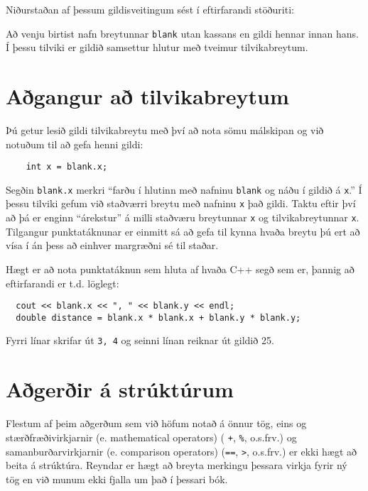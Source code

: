 
Niðurstaðan af þessum gildisveitingum sést í eftirfarandi stöðuriti:

\vspace{0.1in}
\centerline{}
\vspace{0.1in}

Að venju birtist nafn breytunnar {\tt blank} utan kassans en gildi hennar innan hans.
Í þessu tilviki er gildið samsettur hlutur með tveimur tilvikabreytum.

\section{Aðgangur að tilvikabreytum}

Þú getur lesið gildi tilvikabreytu með því að nota sömu málskipan og við notuðum til að gefa henni gildi:

\begin{verbatim}
    int x = blank.x;
\end{verbatim}
%
Segðin {\tt blank.x} merkri ``farðu í hlutinn með nafninu {\tt blank} og náðu í gildið á {\tt x}.''
Í þessu tilviki gefum við staðværri breytu með nafninu {\tt x} það gildi.
Taktu eftir því að þá er enginn ``árekstur'' á milli staðværu breytunnar {\tt x} og tilvikabreytunnar {\tt x}.
Tilgangur punktatáknunar er einmitt sá að gefa til kynna hvaða breytu þú ert að vísa í án þess að einhver margræðni sé til staðar.

Hægt er að nota punktatáknun sem hluta af hvaða C++ segð sem er, þannig að eftirfarandi er t.d. löglegt:

\begin{verbatim}
  cout << blank.x << ", " << blank.y << endl;
  double distance = blank.x * blank.x + blank.y * blank.y;
\end{verbatim}
%
Fyrri línar skrifar út {\tt 3, 4} og seinni línan reiknar út gildið 25.

\section{Aðgerðir á strúktúrum}

Flestum af þeim aðgerðum sem við höfum notað á önnur tög, eins og stærðfræðivirkjarnir (e. mathematical operators) ( {\tt +}, {\tt \%}, o.s.frv.)
og samanburðarvirkjarnir (e. comparison operators) ({\tt ==}, {\tt >}, o.s.frv.) er ekki hægt að beita á strúktúra.
Reyndar er hægt að breyta merkingu þessara virkja fyrir ný tög en við munum ekki fjalla um það í þessari bók.

